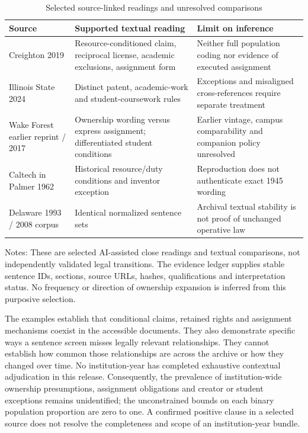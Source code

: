 \documentclass[12pt]{article}
\begin{document}
\begin{table}[htbp]
\centering\caption{Selected source-linked readings and unresolved comparisons}\label{tab:readings}
\small
\begin{tabularx}{\linewidth}{@{}>{\raggedright\arraybackslash}p{.20\linewidth}>{\raggedright\arraybackslash}X>{\raggedright\arraybackslash}X@{}}
\toprule
Source & Supported textual reading & Limit on inference \\
\midrule
Creighton 2019 & Resource-conditioned claim, reciprocal license, academic exclusions, assignment form & Neither full population coding nor evidence of executed assignment \\
Illinois State 2024 & Distinct patent, academic-work and student-coursework rules & Exceptions and misaligned cross-references require separate treatment \\
Wake Forest earlier reprint / 2017 & Ownership wording versus express assignment; differentiated student conditions & Earlier vintage, campus comparability and companion policy unresolved \\
Caltech in Palmer 1962 & Historical resource/duty conditions and inventor exception & Reproduction does not authenticate exact 1945 wording \\
Delaware 1993 / 2008 corpus & Identical normalized sentence sets & Archival textual stability is not proof of unchanged operative law \\
\bottomrule
\end{tabularx}
\par\smallskip\footnotesize\raggedright Notes: These are selected AI-assisted close readings and textual comparisons, not independently validated legal transitions. The evidence ledger supplies stable sentence IDs, sections, source URLs, hashes, qualifications and interpretation status. No frequency or direction of ownership expansion is inferred from this purposive selection.
\end{table}

The examples establish that conditional claims, retained rights and assignment mechanisms coexist in the accessible documents. They also demonstrate specific ways a sentence screen misses legally relevant relationships. They cannot establish how common those relationships are across the archive or how they changed over time. No institution-year has completed exhaustive contextual adjudication in this release. Consequently, the prevalence of institution-wide ownership presumptions, assignment obligations and creator or student exceptions remains unidentified; the unconstrained bounds on each binary population proportion are zero to one. A confirmed positive clause in a selected source does not resolve the completeness and scope of an institution-year bundle.
\end{document}

